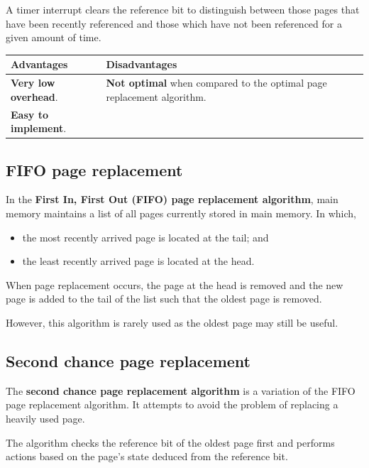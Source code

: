 \documentclass[a4paper]{systems-software}
\begin{document}
A timer interrupt clears the reference bit to distinguish between those pages that have been recently referenced and those which have not been referenced for a given amount of time.

\newpage

\begin{longtabu} to \textwidth {| X[1,l] | X[1,l] |}
    \hline
    \textbf{Advantages} & \textbf{Disadvantages}
	\\ \hline
	\textbf{Very low overhead}. & \textbf{Not optimal} when compared to the optimal page replacement algorithm.
	\\ \hline
	\textbf{Easy to implement}. &
	\\ \hline
\end{longtabu}


\subsection*{FIFO page replacement}

In the \textbf{First In, First Out (FIFO) page replacement algorithm}, main memory maintains a list of all pages currently stored in main memory. In which,
\begin{itemize}
	\item the most recently arrived page is located at the tail; and
	\item the least recently arrived page is located at the head.
\end{itemize}

When page replacement occurs, the page at the head is removed and the new page is added to the tail of the list such that the oldest page is removed.

However, this algorithm is rarely used as the oldest page may still be useful.


\subsection*{Second chance page replacement}

The \textbf{second chance page replacement algorithm} is a variation of the FIFO page replacement algorithm. It attempts to avoid the problem of replacing a heavily used page.

The algorithm checks the reference bit of the oldest page first and performs actions based on the page's state deduced from the reference bit.
\end{document}
